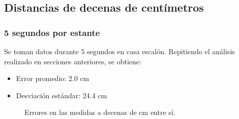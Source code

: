 \documentclass[main]{subfiles}
\begin{document}
\newpage
\subsection{Distancias de decenas de centímetros}

\subsubsection{5 segundos por estante}

Se toman datos durante 5 segundos en casa escalón. Repitiendo el análisis realizado en secciones anteriores, se obtiene:
\begin{itemize}
\item Error promedio: 2.0 cm
\item Desviación estándar: 24.4 cm
\end{itemize}

\begin{figure}[H]
\hspace{-50pt}
  \caption{Errores en las medidas a decenas de cm entre sí.}
\label{fig:cm-err}
\end{figure}
\end{document}
